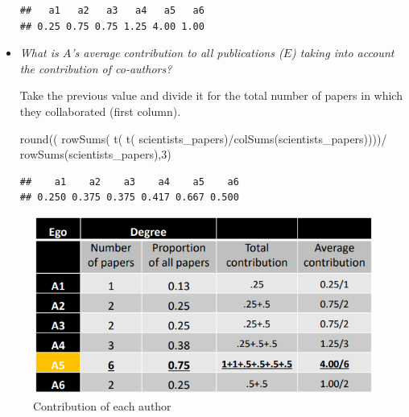 \documentclass[
  notitlepage,
  onecolumn,
  openany]{book}
\newenvironment{Shaded}{\begin{snugshade}}{\end{snugshade}}
\newcommand{\DecValTok}[1]{\textcolor[rgb]{0.00,0.00,0.81}{#1}}
\newcommand{\FunctionTok}[1]{\textcolor[rgb]{0.00,0.00,0.00}{#1}}
\newcommand{\NormalTok}[1]{#1}
\newcommand{\SpecialCharTok}[1]{\textcolor[rgb]{0.00,0.00,0.00}{#1}}
\begin{document}
\begin{itemize}
\begin{verbatim}
##   a1   a2   a3   a4   a5   a6 
## 0.25 0.75 0.75 1.25 4.00 1.00
\end{verbatim}
\item
  \emph{What is \(A\)'s average contribution to all publications (\(E\)) taking into account the contribution of co-authors?}

  Take the previous value and divide it for the total number of papers in which they collaborated (first column).

\begin{Shaded}
\begin{Highlighting}[]
\FunctionTok{round}\NormalTok{((}
  \FunctionTok{rowSums}\NormalTok{(}
    \FunctionTok{t}\NormalTok{(}
      \FunctionTok{t}\NormalTok{(}
\NormalTok{        scientists\_papers)}\SpecialCharTok{/}\FunctionTok{colSums}\NormalTok{(scientists\_papers))))}\SpecialCharTok{/}
    \FunctionTok{rowSums}\NormalTok{(scientists\_papers),}\DecValTok{3}\NormalTok{) }
\end{Highlighting}
\end{Shaded}

\begin{verbatim}
##    a1    a2    a3    a4    a5    a6 
## 0.250 0.375 0.375 0.417 0.667 0.500
\end{verbatim}
\end{itemize}

\begin{figure}[h!]

{\centering \includegraphics[width=0.7\linewidth]{images/10-Two mode networks/Untitled 5} 

}

\caption{Contribution of each author}\label{fig:unnamed-chunk-67}
\end{figure}
\end{document}

